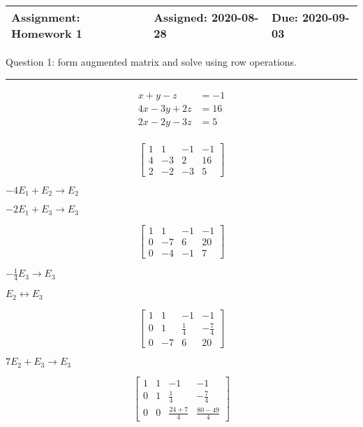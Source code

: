 \documentclass[a4paper,11pt,twoside]{report}
\begin{document}
 
\begin{table}[htpb]
	\centering
	\large
	\begin{tabular}{| p{7.6cm} | p{3.9cm} | p{3cm} |}
		\hline
	Assignment: Homework 1 &	Assigned: 2020-08-28   & Due: 2020-09-03 \\
	\hline
	\end{tabular}
\end{table}
\small

\noindent Question 1: form augmented matrix and solve using row operations. \\ \hrule

\begin{align*}
	x + y - z &= -1 \\
	4x -3y +2z &= 16 \\
	2x - 2y -3z &= 5 \\
\end{align*}

\[\begin{bmatrix} 1 & 1 & -1 & -1 \\ 4 & -3 & 2 & 16 \\ 2 & -2 & -3 & 5 \end{bmatrix} \]

$-4E_1 + E_2 \to E_2$

$-2E_1 + E_3 \to E_3$

\[\begin{bmatrix} 1 & 1 & -1 & -1 \\ 0 & -7 & 6 & 20 \\ 0 & -4 & -1 & 7 \end{bmatrix} \]

$-\frac{1}{4}E_3 \to E_3$

$E_2 \leftrightarrow E_3$

\[\begin{bmatrix} 1 & 1 & -1 & -1 \\ 0 & 1 & \frac{1}{4} & -\frac{7}{4}\\ 0 & -7 & 6 & 20  \end{bmatrix} \]

$7E_2 + E_3 \to E_3$

\[\begin{bmatrix} 1 & 1 & -1 & -1 \\ 0 & 1 & \frac{1}{4} & -\frac{7}{4}\\ 0 & 0 & \frac{24+7}{4} & \frac{80-49}{4}  \end{bmatrix} \]
\end{document}
